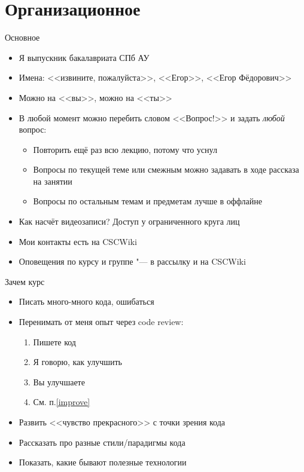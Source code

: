 \section{Организационное}
\begin{frame}[t]{Основное}
	\begin{itemize}
	\item Я выпускник бакалавриата СПб АУ
	\item Имена: <<извините, пожалуйста>>, <<Егор>>, <<Егор Фёдорович>>
	\item Можно на <<вы>>, можно на <<ты>>
	\item В любой момент можно перебить словом <<Вопрос!>> и задать \textit{любой} вопрос:
		\begin{itemize}
		\item Повторить ещё раз всю лекцию, потому что уснул
		\item Вопросы по текущей теме или смежным можно задавать в ходе рассказа на занятии
		\item Вопросы по остальным темам и предметам лучше в оффлайне
		\end{itemize}
	\item Как насчёт видеозаписи? Доступ у ограниченного круга лиц
	\item Мои контакты есть на CSCWiki
	\item Оповещения по курсу и группе "--- в рассылку и на CSCWiki
	\end{itemize}
\end{frame}

\begin{frame}[t]{Зачем курс}
	\begin{itemize}
		\item Писать много-много кода, ошибаться
		\item Перенимать от меня опыт через code review:
			\begin{enumerate}
			\item Пишете код
			\item \label{improve} Я говорю, как улучшить
			\item Вы улучшаете
			\item См. п.\ref{improve}
			\end{enumerate}
		\item Развить <<чувство прекрасного>> с точки зрения кода
		\item Рассказать про разные стили/парадигмы кода
		\item Показать, какие бывают полезные технологии
	\end{itemize}
\end{frame}

